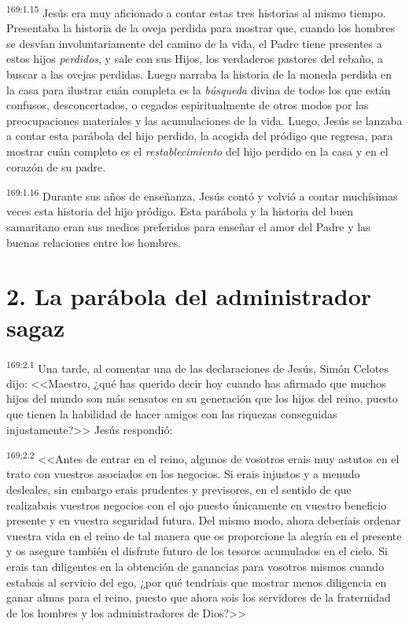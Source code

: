 \par 
\textsuperscript{169:1.15} Jesús era muy aficionado a contar estas tres historias al mismo tiempo. Presentaba la historia de la oveja perdida para mostrar que, cuando los hombres se desvían involuntariamente del camino de la vida, el Padre tiene presentes a estos hijos \textit{perdidos}, y sale con sus Hijos, los verdaderos pastores del rebaño, a buscar a las ovejas perdidas. Luego narraba la historia de la moneda perdida en la casa para ilustrar cuán completa es la \textit{búsqueda} divina de todos los que están confusos, desconcertados, o cegados espiritualmente de otros modos por las preocupaciones materiales y las acumulaciones de la vida. Luego, Jesús se lanzaba a contar esta parábola del hijo perdido, la acogida del pródigo que regresa, para mostrar cuán completo es el \textit{restablecimiento} del hijo perdido en la casa y en el corazón de su padre.

\par 
\textsuperscript{169:1.16} Durante sus años de enseñanza, Jesús contó y volvió a contar muchísimas veces esta historia del hijo pródigo. Esta parábola y la historia del buen samaritano eran sus medios preferidos para enseñar el amor del Padre y las buenas relaciones entre los hombres.

\section*{2. La parábola del administrador sagaz}
\par 
\textsuperscript{169:2.1} Una tarde, al comentar una de las declaraciones de Jesús, Simón Celotes dijo: <<Maestro, ¿qué has querido decir hoy cuando has afirmado que muchos hijos del mundo son más sensatos en su generación que los hijos del reino, puesto que tienen la habilidad de hacer amigos con las riquezas conseguidas injustamente?>> Jesús respondió:

\par 
\textsuperscript{169:2.2} <<Antes de entrar en el reino, algunos de vosotros erais muy astutos en el trato con vuestros asociados en los negocios. Si erais injustos y a menudo desleales, sin embargo erais prudentes y previsores, en el sentido de que realizabais vuestros negocios con el ojo puesto únicamente en vuestro beneficio presente y en vuestra seguridad futura. Del mismo modo, ahora deberíais ordenar vuestra vida en el reino de tal manera que os proporcione la alegría en el presente y os asegure también el disfrute futuro de los tesoros acumulados en el cielo. Si erais tan diligentes en la obtención de ganancias para vosotros mismos cuando estabais al servicio del ego, ¿por qué tendríais que mostrar menos diligencia en ganar almas para el reino, puesto que ahora sois los servidores de la fraternidad de los hombres y los administradores de Dios?>>

